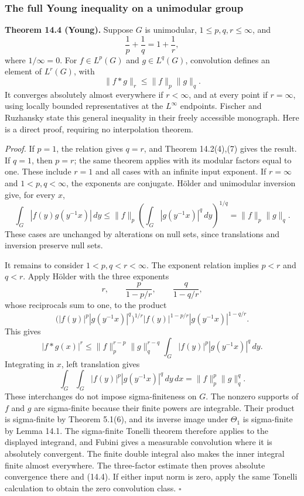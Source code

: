 \documentclass[
  english,
  11pt,
  a4paper,
]{article}
\begin{document}
\subsubsection{The full Young inequality on a unimodular
group}\label{haar-measure-on-locally-compact-groups--young-unimodular}

\textbf{Theorem 14.4 (Young).} Suppose \(G\) is unimodular,
\(1\leq p,q,r\leq\infty\), and \[\frac1p+\frac1q=1+\frac1r,\] where
\(1/\infty=0\). For \(f\in L^p(G)\) and \(g\in L^q(G)\), convolution
defines an element of \(L^r(G)\), with \[\|f*g\|_r\leq\|f\|_p\|g\|_q.
\tag{14.4}\] It converges absolutely almost everywhere if \(r<\infty\),
and at every point if \(r=\infty\), using locally bounded
representatives at the \(L^\infty\) endpoints. Fischer and Ruzhansky
state this general inequality in their freely accessible monograph. Here
is a direct proof, requiring no interpolation theorem.

\emph{Proof.} If \(p=1\), the relation gives \(q=r\), and Theorem
14.2(4),(7) gives the result. If \(q=1\), then \(p=r\); the same theorem
applies with its modular factors equal to one. These include \(r=1\) and
all cases with an infinite input exponent. If \(r=\infty\) and
\(1<p,q<\infty\), the exponents are conjugate. Hölder and unimodular
inversion give, for every \(x\), \[\int_G|f(y)g(y^{-1}x)|\,dy
\leq\|f\|_p\left(\int_G|g(y^{-1}x)|^q\,dy\right)^{1/q}
=\|f\|_p\|g\|_q.\] These cases are unchanged by alterations on null
sets, since translations and inversion preserve null sets.

It remains to consider \(1<p,q<r<\infty\). The exponent relation implies
\(p<r\) and \(q<r\). Apply Hölder with the three exponents
\[r,\qquad \frac{p}{1-p/r},\qquad \frac{q}{1-q/r},\] whose reciprocals
sum to one, to the product \[\bigl(|f(y)|^p|g(y^{-1}x)|^q\bigr)^{1/r}
|f(y)|^{1-p/r}|g(y^{-1}x)|^{1-q/r}.\] This gives \[|f*g(x)|^r
\leq \|f\|_p^{r-p}\|g\|_q^{r-q}
\int_G|f(y)|^p|g(y^{-1}x)|^q\,dy.\] Integrating in \(x\), left
translation gives \[\int_G\int_G|f(y)|^p|g(y^{-1}x)|^q\,dy\,dx
=\|f\|_p^p\|g\|_q^q.\] These interchanges do not impose sigma-finiteness
on \(G\). The nonzero supports of \(f\) and \(g\) are sigma-finite
because their finite powers are integrable. Their product is
sigma-finite by Theorem 5.1(6), and its inverse image under \(\Theta_1\)
is sigma-finite by Lemma 14.1. The sigma-finite Tonelli theorem
therefore applies to the displayed integrand, and Fubini gives a
measurable convolution where it is absolutely convergent. The finite
double integral also makes the inner integral finite almost everywhere.
The three-factor estimate then proves absolute convergence there and
(14.4). If either input norm is zero, apply the same Tonelli calculation
to obtain the zero convolution class. \(\square\)
\end{document}
